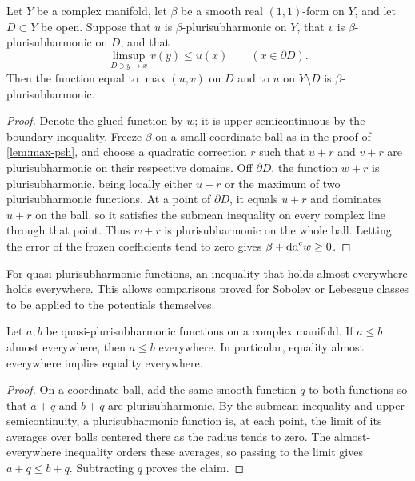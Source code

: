 \begin{lemma}\label{lem:qpsh-gluing}
Let $Y$ be a complex manifold, let $\beta$ be a smooth real $(1,1)$-form on $Y$, and let $D\subset Y$ be open. Suppose that $u$ is $\beta$-plurisubharmonic on $Y$, that $v$ is $\beta$-plurisubharmonic on $D$, and that
\[
 \limsup_{D\ni y\to x}v(y)\leq u(x)\qquad(x\in\partial D).
\]
Then the function equal to $\max(u,v)$ on $D$ and to $u$ on $Y\setminus D$ is $\beta$-plurisubharmonic.
\end{lemma}
\begin{proof}
Denote the glued function by $w$; it is upper semicontinuous by the boundary inequality. Freeze $\beta$ on a small coordinate ball as in the proof of \cref{lem:max-psh}, and choose a quadratic correction $r$ such that $u+r$ and $v+r$ are plurisubharmonic on their respective domains. Off $\partial D$, the function $w+r$ is plurisubharmonic, being locally either $u+r$ or the maximum of two plurisubharmonic functions. At a point of $\partial D$, it equals $u+r$ and dominates $u+r$ on the ball, so it satisfies the submean inequality on every complex line through that point. Thus $w+r$ is plurisubharmonic on the whole ball. Letting the error of the frozen coefficients tend to zero gives $\beta+\mathrm{dd}^{\mathrm{c}} w\geq0$.
\end{proof}

For quasi-plurisubharmonic functions, an inequality that holds almost everywhere holds everywhere. This allows comparisons proved for Sobolev or Lebesgue classes to be applied to the potentials themselves.

\begin{lemma}\label{lem:qpsh-almost-everywhere-order}
Let $a,b$ be quasi-plurisubharmonic functions on a complex manifold. If $a\leq b$ almost everywhere, then $a\leq b$ everywhere. In particular, equality almost everywhere implies equality everywhere.
\end{lemma}
\begin{proof}
On a coordinate ball, add the same smooth function $q$ to both functions so that $a+q$ and $b+q$ are plurisubharmonic. By the submean inequality and upper semicontinuity, a plurisubharmonic function is, at each point, the limit of its averages over balls centered there as the radius tends to zero. The almost-everywhere inequality orders these averages, so passing to the limit gives $a+q\leq b+q$. Subtracting $q$ proves the claim.
\end{proof}

